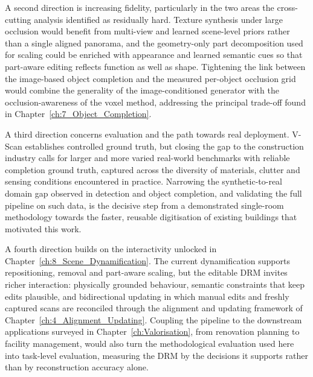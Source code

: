 A second direction is increasing fidelity, particularly in the two areas the cross-cutting analysis identified as residually hard. Texture synthesis under large occlusion would benefit from multi-view and learned scene-level priors rather than a single aligned panorama, and the geometry-only part decomposition used for scaling could be enriched with appearance and learned semantic cues so that part-aware editing reflects function as well as shape. Tightening the link between the image-based object completion and the measured per-object occlusion grid would combine the generality of the image-conditioned generator with the occlusion-awareness of the voxel method, addressing the principal trade-off found in Chapter~\ref{ch:7_Object_Completion}.

A third direction concerns evaluation and the path towards real deployment. V-Scan establishes controlled ground truth, but closing the gap to the construction industry calls for larger and more varied real-world benchmarks with reliable completion ground truth, captured across the diversity of materials, clutter and sensing conditions encountered in practice. Narrowing the synthetic-to-real domain gap observed in detection and object completion, and validating the full pipeline on such data, is the decisive step from a demonstrated single-room methodology towards the faster, reusable digitisation of existing buildings that motivated this work.

A fourth direction builds on the interactivity unlocked in Chapter~\ref{ch:8_Scene_Dynamification}. The current dynamification supports repositioning, removal and part-aware scaling, but the editable \gls{DRM} invites richer interaction: physically grounded behaviour, semantic constraints that keep edits plausible, and bidirectional updating in which manual edits and freshly captured scans are reconciled through the alignment and updating framework of Chapter~\ref{ch:4_Alignment_Updating}. Coupling the pipeline to the downstream applications surveyed in Chapter~\ref{ch:Valorisation}, from renovation planning to facility management, would also turn the methodological evaluation used here into task-level evaluation, measuring the \gls{DRM} by the decisions it supports rather than by reconstruction accuracy alone.

